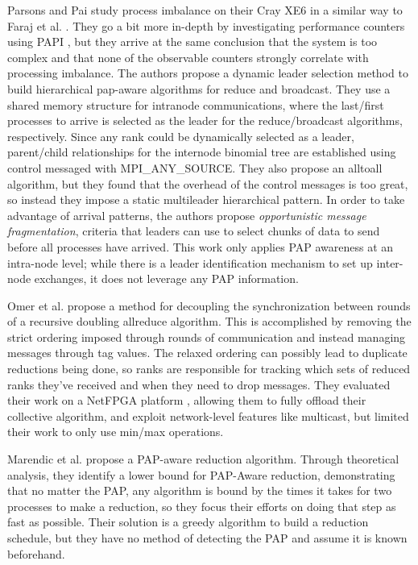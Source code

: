 Parsons and Pai \cite{Parsons2015ExpProcImbMPICollHierarcialSys} study process imbalance on their Cray XE6 in a similar way to Faraj et al. \cite{Faraj2008StudyProcArrivalMPIColl}.
They go a bit more in-depth by investigating performance counters using PAPI \cite{Mucci1999PAPI}, but they arrive at the same conclusion that the system is too complex and that none of the observable counters strongly correlate with processing imbalance. 
The authors propose a dynamic leader selection method to build hierarchical pap-aware algorithms for reduce and broadcast.
They use a shared memory structure for intranode communications, where the last/first processes to arrive is selected as the leader for the reduce/broadcast algorithms, respectively. 
Since any rank could be dynamically selected as a leader, parent/child relationships for the internode binomial tree are established using control messaged with MPI\_ANY\_SOURCE. 
They also propose an alltoall algorithm, but they found that the overhead of the control messages is too great, so instead they impose a static multileader hierarchical pattern.
In order to take advantage of arrival patterns, the authors propose \textit{opportunistic message fragmentation}, criteria that leaders can use to select chunks of data to send before all processes have arrived.
This work only applies PAP awareness at an intra-node level; while there is a leader identification mechanism to set up inter-node exchanges, it does not leverage any PAP information.

Omer et al. \cite{Arap2015AdaptiveRDForCC} propose a method for decoupling the synchronization between rounds of a recursive doubling allreduce algorithm. 
This is accomplished by removing the strict ordering imposed through rounds of communication and instead managing messages through tag values.
The relaxed ordering can possibly lead to duplicate reductions being done, so ranks are responsible for tracking which sets of reduced ranks they've received and when they need to drop messages.
They evaluated their work on a NetFPGA platform \cite{Lockwood2007NetFPGA}, allowing them to fully offload their collective algorithm, and exploit network-level features like multicast, but limited their work to only use min/max operations.

Marendic et al. \cite{Marendic2016Clairvoyant} propose a PAP-aware reduction algorithm.
Through theoretical analysis, they identify a lower bound for PAP-Aware reduction, demonstrating that no matter the PAP, any algorithm is bound by the times it takes for two processes to make a reduction, so they focus their efforts on doing that step as fast as possible. 
Their solution is a greedy algorithm to build a reduction schedule, but they have no method of detecting the PAP and assume it is known beforehand.

